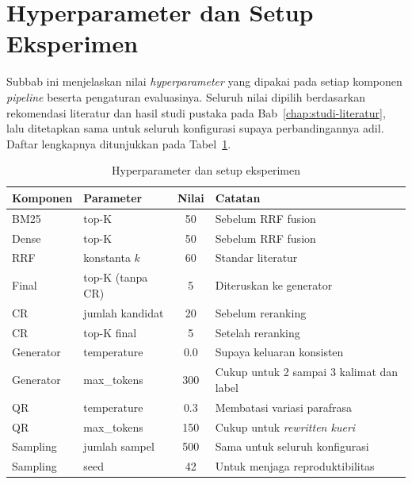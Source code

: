 \section{Hyperparameter dan Setup Eksperimen}
\label{sec:hyperparameter-setup}

Subbab ini menjelaskan nilai \textit{hyperparameter} yang dipakai pada setiap komponen \textit{pipeline} beserta pengaturan evaluasinya. Seluruh nilai dipilih berdasarkan rekomendasi literatur dan hasil studi pustaka pada Bab~\ref{chap:studi-literatur}, lalu ditetapkan sama untuk seluruh konfigurasi supaya perbandingannya adil. Daftar lengkapnya ditunjukkan pada Tabel~\ref{tbl:hyperparameter}.

\begin{table}[H]
\centering
\caption{Hyperparameter dan setup eksperimen}
\label{tbl:hyperparameter}
\begin{tabular}{|p{3cm}|p{4.2cm}|c|p{3.5cm}|}
\hline
\textbf{Komponen} & \textbf{Parameter} & \textbf{Nilai} & \textbf{Catatan} \\ \hline
BM25      & top-K             & 50    & Sebelum RRF fusion \\ \hline
Dense     & top-K             & 50    & Sebelum RRF fusion \\ \hline
RRF       & konstanta $k$     & 60    & Standar literatur \\ \hline
Final     & top-K (tanpa CR)  & 5     & Diteruskan ke generator \\ \hline
CR        & jumlah kandidat   & 20    & Sebelum reranking \\ \hline
CR        & top-K final       & 5     & Setelah reranking \\ \hline
Generator & temperature       & 0.0   & Supaya keluaran konsisten \\ \hline
Generator & max\_tokens       & 300   & Cukup untuk 2 sampai 3 kalimat dan label \\ \hline
QR        & temperature       & 0.3   & Membatasi variasi parafrasa \\ \hline
QR        & max\_tokens       & 150   & Cukup untuk \textit{rewritten kueri} \\ \hline
Sampling  & jumlah sampel     & 500   & Sama untuk seluruh konfigurasi \\ \hline
Sampling  & seed              & 42    & Untuk menjaga reproduktibilitas \\ \hline
\end{tabular}
\end{table}

